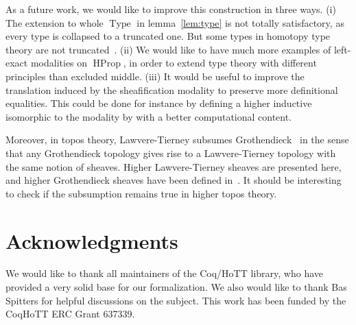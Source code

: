 \documentclass[preprint,9pt,numbers]{sigplanconf}
\newcommand{\mynote}[2]{
    \fbox{\bfseries\sffamily\scriptsize#1}
    {\small$\blacktriangleright$\textsf{\emph{#2}}$\blacktriangleleft$}~}
\newcommand\nt[1]{\mynote{NT}{#1}}
\newcommand{\eg}{e.g,\xspace}
\DeclareMathOperator{\Type}{Type}
\DeclareMathOperator{\HProp}{HProp}
\begin{document}

As a future work, we would like to improve this construction in three
ways.
(i) The extension to whole $\Type$ in lemma~\ref{lem:type} is not
  totally satisfactory, as every type is collapsed to a truncated
  one. But some types in homotopy type theory are not
  truncated~\cite[Example 8.8.6]{hottbook}.
(ii) 
  We would like to have much more examples of left-exact modalities on
  $\HProp$, in order to extend type theory with different principles
  than excluded middle.
(iii) It would be useful to improve the translation induced by the
  sheafification modality to preserve more definitional equalities.
  This could be done for instance by defining a higher inductive
  isomorphic to the modality by with a better computational content. 

Moreover, in topos theory, Lawvere-Tierney subsumes Grothen\-dieck~\cite[Section~V.4]{maclanemoerdijk} in the sense that any
Grothen\-dieck topology gives rise to a Lawvere-Tierney topology with
the same notion of sheaves. Higher Lawvere-Tierney sheaves are
presented here, and higher Grothendieck sheaves have been defined
in~\cite{lurie}. It should be interesting to check if the subsumption
remains true in higher topos theory.



\section*{Acknowledgments}

We would like to thank all maintainers of the Coq/HoTT library, who
have provided a very solid base for our formalization. 
%
We also would like to thank Bas Spitters for helpful discussions on
the subject.
%
This work has been funded by the CoqHoTT ERC Grant 637339.



\end{document}
